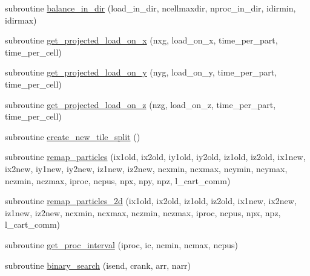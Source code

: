 \begin{DoxyCompactItemize}
subroutine \hyperlink{namespaceload__balance_ad4c6fb0e9afcfb791d37effad4fce7b0}{balance\+\_\+in\+\_\+dir} (load\+\_\+in\+\_\+dir, ncellmaxdir, nproc\+\_\+in\+\_\+dir, idirmin, idirmax)
\item 
subroutine \hyperlink{namespaceload__balance_aa6300dc3f17e242019b61dd4a5b24837}{get\+\_\+projected\+\_\+load\+\_\+on\+\_\+x} (nxg, load\+\_\+on\+\_\+x, time\+\_\+per\+\_\+part, time\+\_\+per\+\_\+cell)
\item 
subroutine \hyperlink{namespaceload__balance_ab142c37dc5124945701b728ff7447959}{get\+\_\+projected\+\_\+load\+\_\+on\+\_\+y} (nyg, load\+\_\+on\+\_\+y, time\+\_\+per\+\_\+part, time\+\_\+per\+\_\+cell)
\item 
subroutine \hyperlink{namespaceload__balance_a7808443cfc827402ff6fdc18042a7325}{get\+\_\+projected\+\_\+load\+\_\+on\+\_\+z} (nzg, load\+\_\+on\+\_\+z, time\+\_\+per\+\_\+part, time\+\_\+per\+\_\+cell)
\item 
subroutine \hyperlink{namespaceload__balance_a1b48248474342795414464922bd12126}{create\+\_\+new\+\_\+tile\+\_\+split} ()
\item 
subroutine \hyperlink{namespaceload__balance_a763d93918d09c31698f45ba8eb6d0112}{remap\+\_\+particles} (ix1old, ix2old, iy1old, iy2old, iz1old, iz2old,                                                                                                                       ix1new, ix2new, iy1new, iy2new, iz1new, iz2new,                                                                                                                       ncxmin, ncxmax, ncymin, ncymax, nczmin, nczmax,                                                                                                                       iproc, ncpus, npx, npy, npz, l\+\_\+cart\+\_\+comm)
\item 
subroutine \hyperlink{namespaceload__balance_a6c1308b9aa42cf5737f4e2b86f0f14c7}{remap\+\_\+particles\+\_\+2d} (ix1old, ix2old, iz1old, iz2old,                                                                                                                       ix1new, ix2new, iz1new, iz2new,                                                                                                                       ncxmin, ncxmax, nczmin, nczmax,                                                                                                                       iproc, ncpus, npx, npz, l\+\_\+cart\+\_\+comm)
\item 
subroutine \hyperlink{namespaceload__balance_a087dd46e7ee1525b5d13fd38e60ec939}{get\+\_\+proc\+\_\+interval} (iproc, ic, ncmin, ncmax, ncpus)
\item 
subroutine \hyperlink{namespaceload__balance_ac4f4010ec67a5d146b5c288511b4f98a}{binary\+\_\+search} (isend, crank, arr, narr)
\end{DoxyCompactItemize}


